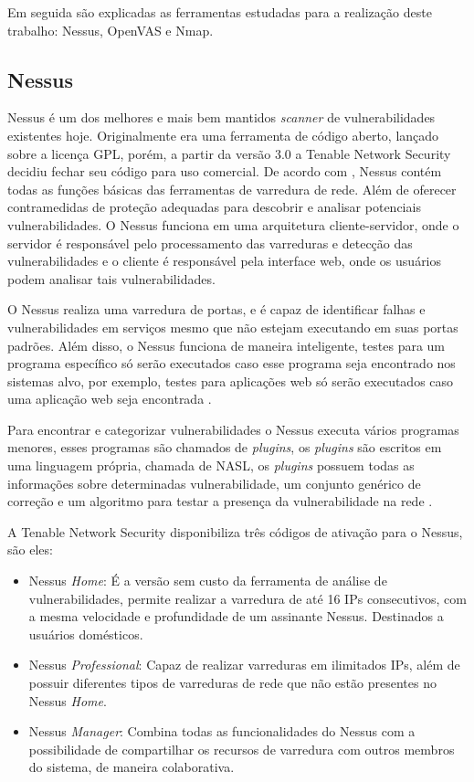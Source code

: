 Em seguida são explicadas as ferramentas estudadas para a realização deste trabalho: Nessus, \gls{OpenVAS} e \gls{Nmap}.

\subsection{Nessus}
Nessus é um dos melhores e mais bem mantidos \textit{scanner} de vulnerabilidades existentes hoje. Originalmente era uma ferramenta de código aberto, lançado sobre a licença \gls{GPL}, porém, a partir da versão 3.0 a Tenable Network Security decidiu fechar seu código para uso comercial. De acordo com , Nessus contém todas as funções básicas das ferramentas de varredura de rede. Além de oferecer contramedidas de proteção adequadas para descobrir e analisar potenciais vulnerabilidades. O Nessus funciona em uma arquitetura cliente-servidor, onde o servidor é responsável pelo processamento das varreduras e detecção das vulnerabilidades e o cliente é responsável pela interface web, onde os usuários podem analisar tais vulnerabilidades.

O Nessus realiza uma varredura de portas, e é capaz de identificar falhas e vulnerabilidades em serviços mesmo que não estejam executando em suas portas padrões. Além disso, o Nessus funciona de maneira inteligente, testes para um programa específico só serão executados caso esse programa seja encontrado nos sistemas alvo, por exemplo, testes para aplicações web só serão executados caso uma aplicação web seja encontrada \cite{anderson2003introduction}.

Para encontrar e categorizar vulnerabilidades o Nessus executa vários programas menores, esses programas são chamados de \textit{plugins}, os \textit{plugins} são escritos em uma linguagem própria, chamada de \gls{NASL}, os \textit{plugins} possuem todas as informações sobre determinadas vulnerabilidade, um conjunto genérico de correção e um algoritmo para testar a presença da vulnerabilidade na rede \cite{tenable}.

A Tenable Network Security disponibiliza três códigos de ativação para o Nessus, são eles:
\begin{itemize}
    \item Nessus \textit{Home}: É a versão sem custo da ferramenta de análise de vulnerabilidades, permite realizar a varredura de até 16 \gls{IP}s consecutivos, com a mesma velocidade e profundidade de um assinante Nessus. Destinados a usuários domésticos.
    \item Nessus \textit{Professional}: Capaz de realizar varreduras em ilimitados \gls{IP}s, além de possuir diferentes tipos de varreduras de rede que não estão presentes no Nessus \textit{Home}.
    \item Nessus \textit{Manager}: Combina todas as funcionalidades do Nessus com a possibilidade de compartilhar os recursos de varredura com outros membros do sistema, de maneira colaborativa.
\end{itemize}

